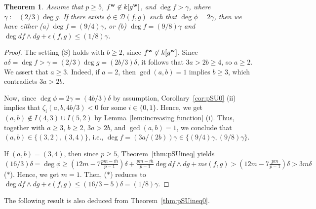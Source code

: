\documentclass{amsart}
\theoremstyle{plain}
\newtheorem{thm}{Theorem}[section]
\theoremstyle{definition}
\newcommand{\ol}{\overline}
\newcommand{\ep}{\epsilon}
\newcommand{\w}{{\bf w}}
\begin{document}
\begin{thm}\label{prop:Exc29}
Assume that $p\ge 5$, 
$f^{\w }\not\in k[g^{\w }]$, and 
$\deg f>\gamma $, where $\gamma :=(2/3)\deg g$. 
If there exists $\phi \in \mathcal{D}(f,g)$ 
such that $\deg \phi =2\gamma $, 
then we have either 
{\rm (a)} $\deg f=(9/4)\gamma $, 
or {\rm (b)} 
$\deg f=(9/8)\gamma $ and $\deg df\wedge dg+\ep (f,g)\le (1/8)\gamma $. 
\end{thm}
\begin{proof}
The setting (S) holds with $b\ge 2$, 
since $f^{\w }\not\in k[g^{\w }]$. 
Since $a\delta =\deg f>\gamma =(2/3)\deg g=(2b/3)\delta $, 
it follows that $3a>2b\ge 4$, 
so $a\ge 2$. 
We assert that $a\ge 3$. 
Indeed, if $a=2$, then $\gcd(a,b)=1$ implies $b\ge 3$, 
which contradicts $3a>2b$. 



Now, since 
$\deg \phi =2\gamma =(4b/3)\delta $ 
by assumption, 
Corollary~\ref{cor:pSU0} (ii) implies that 
$\zeta _i(a,b,4b/3)<0$ for some $i\in \{ 0,1\} $. 
Hence, 
we get $(a,b)\not\in I(4,3)\cup I(5,2)$ 
by Lemma~\ref{lem:increasing function} (i). 
Thus, together with $a\ge 3$, $b\ge 2$, $3a>2b$, and $\gcd (a,b)=1$, 
we conclude that $(a,b)\in \{ (3,2),(3,4)\} $, i.e., 
$\deg f=(3a/(2b))\gamma \in \{ (9/4)\gamma ,(9/8)\gamma \} $. 


If $(a,b)=(3,4)$, 
then since $p\ge 5$, 
Theorem~\ref{thm:pSUineq} yields 
$(16/3)\delta =\deg \phi 
\ge (12m-7\frac{pm-\ol{m}}{p-1})\delta 
+\frac{pm-\ol{m}}{p-1}\deg df\wedge dg+m\ep (f,g)
>(12m-7\frac{pm}{p-1})\delta >3m\delta $ ($*$). 
Hence, we get $m=1$. 
Then, ($*$) reduces to 
$\deg df\wedge dg+\ep (f,g)\le (16/3-5)\delta =(1/8)\gamma $. 
\end{proof}




The following result is also deduced from 
Theorem~\ref{thm:pSUineq0}. 
\end{document}
